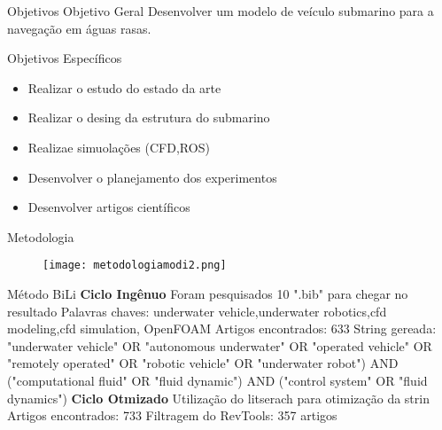 \begin{frame}[t]{Objetivos}
    Objetivo Geral
    \newline
    Desenvolver um modelo de veículo submarino para a navegação em águas rasas.
    \newline

    Objetivos Específicos
    \begin{itemize}
        \item Realizar o estudo do estado da arte
        \item Realizar o desing da estrutura do submarino
        \item Realizae simuolações (CFD,ROS)
        \item Desenvolver o planejamento dos experimentos
        \item Desenvolver artigos científicos
    \end{itemize}
   

\end{frame}
\begin{frame}[c]{Metodologia }
        \begin{figure}
        \texttt{[image: metodologiamodi2.png]}
    \end{figure}
\end{frame}
\begin{frame}[t]{Método BiLi}
    \textbf{Ciclo Ingênuo} 
    \newline
        Foram pesquisados 10 ".bib" para chegar no resultado 
    \newline
        Palavras chaves: underwater vehicle,underwater robotics,cfd modeling,cfd simulation, OpenFOAM
    \newline
        Artigos encontrados: 633
    \newline
        String gereada: "underwater vehicle" OR "autonomous underwater" OR "operated vehicle" OR
        "remotely operated" OR "robotic vehicle" OR "underwater robot") AND ("computational fluid" OR "fluid dynamic") 
        AND ("control system" OR "fluid dynamics")
    \newline
    \textbf{Ciclo Otmizado}
    \newline
        Utilização do litserach para otimização da strin
    \newline
        Artigos encontrados: 733
    \newline
        Filtragem do RevTools: 357 artigos

\end{frame}
